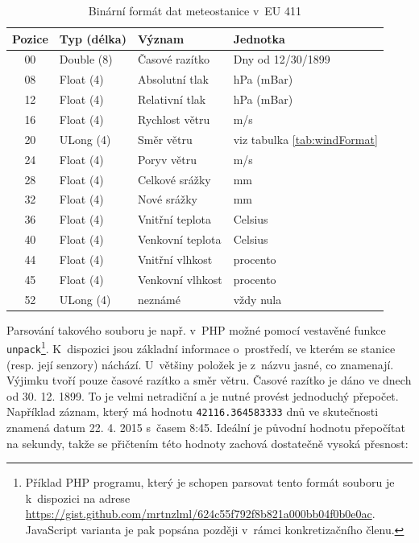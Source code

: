 \begin{table}[h]
	\centering
	\caption{Binární formát dat meteostanice v~EU 411}
	\label{tab:binaryFormat}
	\begin{tabular}{|c|l|l|l|}
		\hline 
		Pozice & Typ (délka) & Význam & Jednotka \\ 
		\hline \hline
		00 & Double (8) & Časové razítko & Dny od 12/30/1899 \\ 
		\hline 
		08 & Float (4) & Absolutní tlak & hPa (mBar) \\ 
		\hline 
		12 & Float (4) & Relativní tlak & hPa (mBar) \\ 
		\hline 
		16 & Float (4) & Rychlost větru & m/s \\ 
		\hline 
		20 & ULong (4) & Směr větru & viz tabulka \ref{tab:windFormat} \\ 
		\hline 
		24 & Float (4) & Poryv větru & m/s \\ 
		\hline 
		28 & Float (4) & Celkové srážky & mm \\ 
		\hline 
		32 & Float (4) & Nové srážky & mm \\ 
		\hline 
		36 & Float (4) & Vnitřní teplota & Celsius \\ 
		\hline 
		40 & Float (4) & Venkovní teplota & Celsius \\ 
		\hline 
		44 & Float (4) & Vnitřní vlhkost & procento \\ 
		\hline 
		45 & Float (4) & Venkovní vlhkost & procento \\ 
		\hline 
		52 & ULong (4) & neznámé & vždy nula \\ 
		\hline 
	\end{tabular}
\end{table}

Parsování takového souboru je např. v~PHP možné pomocí vestavěné funkce \texttt{unpack}\footnote{Příklad PHP programu, který je schopen parsovat tento formát souboru je k~dispozici na adrese \url{https://gist.github.com/mrtnzlml/624c55f792f8b821a000bb04f0b0e0ac}. JavaScript varianta je pak popsána později v~rámci konkretizačního členu.}. K~dispozici jsou základní informace o~prostředí, ve kterém se stanice (resp. její senzory) náchází. U~většiny položek je z~názvu jasné, co znamenají. Výjimku tvoří pouze časové razítko a směr větru. Časové razítko je dáno ve dnech od 30. 12. 1899. To je velmi netradiční a je nutné provést jednoduchý přepočet. Například záznam, který má hodnotu \texttt{42116.364583333} dnů ve skutečnosti znamená datum 22. 4. 2015 s~časem 8:45. Ideální je původní hodnotu přepočítat na sekundy, takže se přičtením této hodnoty zachová dostatečně vysoká přesnost:

